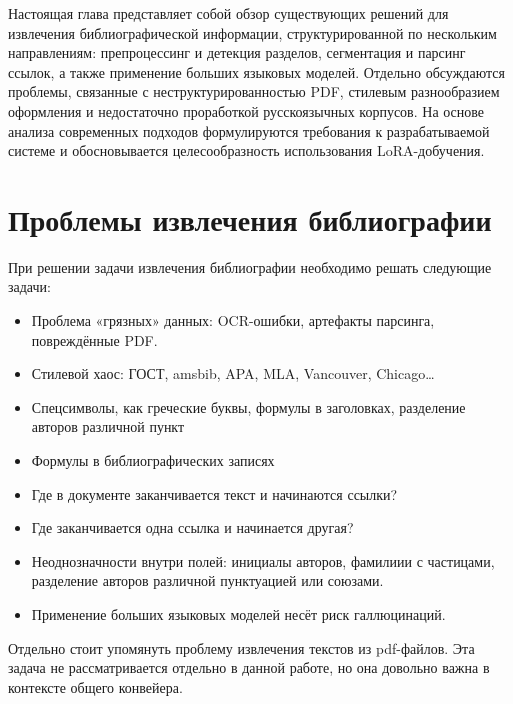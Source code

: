 Настоящая глава представляет собой обзор существующих решений для извлечения библиографической информации, структурированной по нескольким направлениям: препроцессинг и детекция разделов, сегментация и парсинг ссылок, а также применение больших языковых моделей. Отдельно обсуждаются проблемы, связанные с неструктурированностью PDF, стилевым разнообразием оформления и недостаточно проработкой русскоязычных корпусов. На основе анализа современных подходов формулируются требования к разрабатываемой системе и обосновывается целесообразность использования LoRA-добучения.

\section{Проблемы извлечения библиографии}

При решении задачи извлечения библиографии необходимо решать следующие задачи\cite{system_higher}:
\begin{itemize}
    \item Проблема «грязных» данных: OCR-ошибки, артефакты парсинга, повреждённые PDF.
    \item Стилевой хаос: ГОСТ, amsbib, APA, MLA, Vancouver, Chicago…
    \item Спецсимволы, как греческие буквы, формулы в заголовках, разделение авторов различной пункт
    \item Формулы в библиографических записях
    \item Где в документе заканчивается текст и начинаются ссылки? 
    \item Где заканчивается одна ссылка и начинается другая?     
    \item Неоднозначности внутри полей: инициалы авторов, фамилиии с частицами, разделение авторов различной пунктуацией или союзами.
    \item Применение больших языковых моделей несёт риск галлюцинаций.
\end{itemize}

Отдельно стоит упомянуть проблему извлечения текстов из pdf-файлов. Эта задача не рассматривается отдельно в данной работе, но она довольно важна в контексте общего конвейера. 

